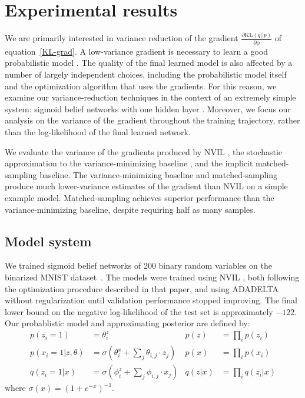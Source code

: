\documentclass{article} %
\def\KL{\text{KL}}
\begin{document}
\section{Experimental results} \label{experimental-section}

We are primarily interested in variance reduction of the gradient $\frac{\partial \KL (q || p)}{\partial \phi}$ of equation~\ref{KL-grad}.  A low-variance gradient is necessary to learn a good probabilistic model \cite{paisley2012variational, mnih2014neural}.  The quality of the final learned model is also affected by a number of largely independent choices, including the probabilistic model itself and the optimization algorithm that uses the gradients.  For this reason, we examine our variance-reduction techniques in the context of an extremely simple system: sigmoid belief networks with one hidden layer \cite{neal1992connectionist}.  Moreover, we focus our analysis on the variance of the gradient throughout the training trajectory, rather than the log-likelihood of the final learned network.

We evaluate the variance of the gradients produced by NVIL \cite{mnih2014neural}, the stochastic approximation to the variance-minimizing baseline \cite{weaver2001optimal, greensmith2004variance}, and the implicit matched-sampling baseline.  The variance-minimizing baseline and matched-sampling produce much lower-variance estimates of the gradient than NVIL on a simple example model.  Matched-sampling achieves superior performance than the variance-minimizing baseline, despite requiring half as many samples.


\subsection{Model system}
   

We trained sigmoid belief networks of 200 binary random variables on the binarized MNIST dataset~\cite{salakhutdinov2008quantitative}.  The models were trained using NVIL \cite{mnih2014neural}, both following the optimization procedure described in that paper, and using ADADELTA \cite{zeiler2012adadelta} without regularization until validation performance stopped improving.  The final lower bound on the negative log-likelihood of the test set is approximately $-122$.
Our probablistic model and approximating posterior are defined by:
\begin{align*}
p(z_i = 1) &= \theta_i^z &
p(z) &= \prod_i p(z_i) \\
p(x_i=1 |z, \theta) &= \sigma \left( \theta_i^x + \sum_j \theta_{i,j} \cdot z_j \right) &
p(x) &= \prod_i p(x_i) \\
q(z_i = 1 | x) &= \sigma \left( \phi_i^z + \sum_j \phi_{i,j} \cdot x_j \right) &
q(z | x) &= \prod_i q(z_i | x)
\end{align*}
where $\sigma(x) = (1 + e^{-x})^{-1}$.
\end{document}
